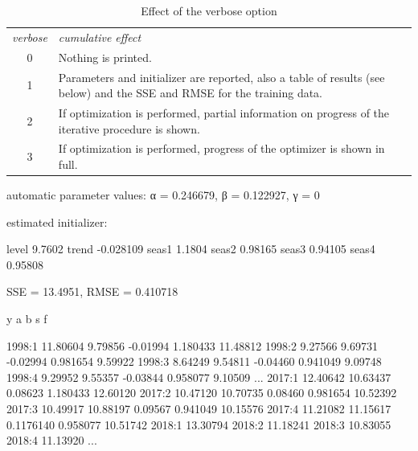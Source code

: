 \documentclass{article}
\begin{document}
\begin{table}[htbp]
  \caption{Effect of the verbose option}
  \label{tab:verbose}  
  \begin{tabular}{cp{4.5in}}
    \textit{verbose} & \textit{cumulative effect} \\[6pt]
    0 & Nothing is printed. \\
    1 & Parameters and initializer are reported, also a table
        of results (see below) and the SSE and RMSE for the
        training data.\\
    2 & If optimization is performed, partial information on
        progress of the iterative procedure is shown. \\
    3 & If optimization is performed, progress of the
        optimizer is shown in full.
  \end{tabular}
\end{table}

\begin{script}[htbp]
    \caption{Partial listing of results from the first example on
      page~\ref{pg:ex1}: \texttt{y} = original data,
      \texttt{a} = level, \texttt{b} = trend,
      \texttt{s} = seasonal, \texttt{f} = forecast. Forecasts
    for 2018:1 and beyond are out-of-sample.}
  \label{list:results}
\begin{code}
automatic parameter values:
  α = 0.246679, β = 0.122927, γ = 0

estimated initializer:

level       9.7602 
trend    -0.028109 
seas1       1.1804 
seas2      0.98165 
seas3      0.94105 
seas4      0.95808

SSE = 13.4951, RMSE = 0.410718

                  y            a            b            s            f

1998:1     11.80604      9.79856     -0.01994     1.180433     11.48812
1998:2      9.27566      9.69731     -0.02994     0.981654      9.59922
1998:3      8.64249      9.54811     -0.04460     0.941049      9.09748
1998:4      9.29952      9.55357     -0.03844     0.958077      9.10509
...
2017:1     12.40642     10.63437      0.08623     1.180433     12.60120
2017:2     10.47120     10.70735      0.08460     0.981654     10.52392
2017:3     10.49917     10.88197      0.09567     0.941049     10.15576
2017:4     11.21082     11.15617    0.1176140     0.958077     10.51742
2018:1                                                         13.30794
2018:2                                                         11.18241
2018:3                                                         10.83055
2018:4                                                         11.13920
...
\end{code}
\end{script}
\end{document}
